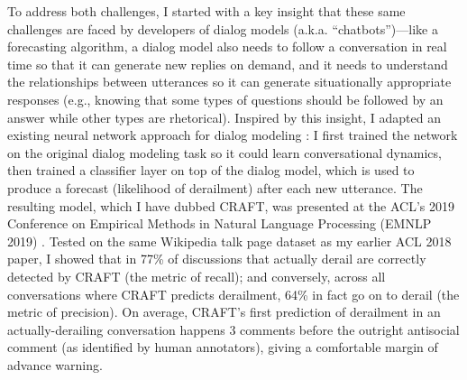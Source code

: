 \documentclass[11pt,letterpaper]{article}
\begin{document}
To address both challenges, I started with a key insight that these same challenges are faced by developers of dialog models (a.k.a. ``chatbots'')---like a forecasting algorithm, a dialog model also needs to follow a conversation in real time so that it can generate new replies on demand, and it needs to understand the relationships between utterances so it can generate situationally appropriate responses (e.g., knowing that some types of questions should be followed by an answer while other types are rhetorical).
Inspired by this insight, I adapted an existing neural network approach for dialog modeling \cite{serban_building_2016}: I first trained the network on the original dialog modeling task so it could learn conversational dynamics, then trained a classifier layer on top of the dialog model, which is used to produce a forecast (likelihood of derailment) after each new utterance.
The resulting model, which I have dubbed CRAFT, was presented at the ACL's 2019 Conference on Empirical Methods in Natural Language Processing (EMNLP 2019) \cite{chang_trouble_2019}.
Tested on the same Wikipedia talk page dataset as my earlier ACL 2018 paper, I showed that in 77\% of discussions that actually derail are correctly detected by CRAFT (the metric of recall); and conversely, across all conversations where CRAFT predicts derailment, 64\% in fact go on to derail (the metric of precision).
On average, CRAFT's first prediction of derailment in an actually-derailing conversation happens 3 comments before the outright antisocial comment (as identified by human annotators), giving a comfortable margin of advance warning.

\vspace{\baselineskip}


\end{document}
